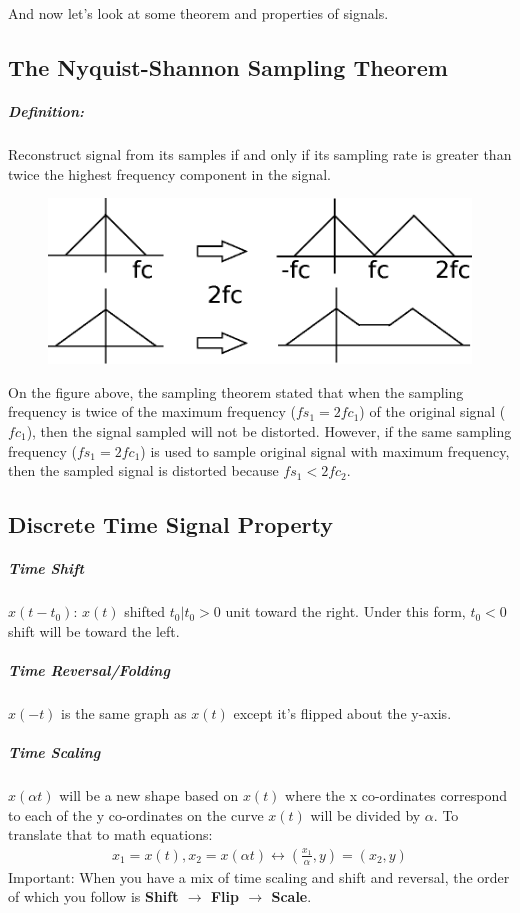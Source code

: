 And now let's look at some theorem and properties of signals.

\subsection*{The Nyquist-Shannon Sampling Theorem}
\subparagraph*{Definition:}Reconstruct signal from its samples if and only if its sampling rate is greater than twice the highest frequency component in the signal.
\begin{figure}[h]
    \includegraphics[width=\textwidth]{../images/lec1/FVE_image_2}
\end{figure}

On the figure above, the sampling theorem stated that when the sampling frequency is twice of the maximum frequency ($fs_1=2fc_1$) of the original signal ($fc_1$), then the signal sampled will not be distorted. However, if the same sampling frequency ($fs_1=2fc_1$) is used to sample original signal with maximum frequency, then the sampled signal is distorted because $fs_1 < 2fc_2$. 

\subsection*{Discrete Time Signal Property}
\subparagraph*{Time Shift} $x(t - t_0)$: $x(t)$ shifted $t_0 | t_0>0$ unit toward the right. Under this form, $t_0<0$ shift will be toward the left.
\subparagraph*{Time Reversal/Folding} $x(-t)$ is the same graph as $x(t)$ except it's flipped about the y-axis.
\subparagraph*{Time Scaling} $x(\alpha t)$ will be a new shape based on $x(t)$ where the x co-ordinates correspond to each of the y co-ordinates on the curve $x(t)$ will be divided by $\alpha$. To translate that to math equations:
\begin{align*}
    x_1 = x(t), x_2 = x(\alpha t) \leftrightarrow (\frac{x_1}{\alpha}, y) = (x_2, y)
\end{align*}
Important: When you have a mix of time scaling and shift and reversal, the order of which you follow is \textbf{Shift $\rightarrow$ Flip $\rightarrow$ Scale}.

